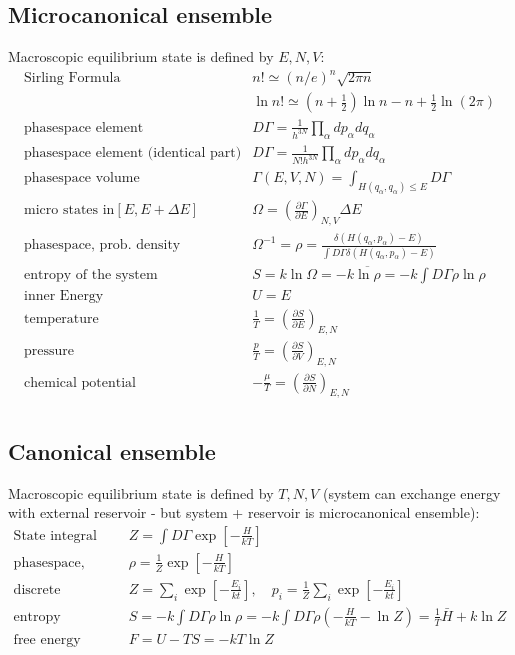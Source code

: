 \documentclass[../main.tex]{subfiles}
\begin{document}
\subsection{Microcanonical ensemble}
Macroscopic equilibrium state is defined by $E,N,V$:
\begin{eqnarray}
\text{Sirling Formula}  & n!\simeq(n/e)^n\sqrt{2\pi n}\\
                        & \ln n!\simeq(n+\frac{1}{2})\ln n-n+\frac{1}{2}\ln(2\pi)\\
\text{phasespace element} &D\Gamma=\frac{1}{h^{3N}}\prod_\alpha dp_\alpha dq_\alpha\\
\text{phasespace element (identical part)} &D\Gamma=\frac{1}{N!h^{3N}}\prod_\alpha dp_\alpha dq_\alpha\\
\text{phasespace volume}  &\Gamma(E,V,N)=\int_{H(q_\alpha,q_\alpha)\le E}D\Gamma\\
\text{micro states in} [E,E+\Delta E]  &\Omega=\left(\frac{\partial\Gamma}{\partial E}\right)_{N,V}\Delta E\\
\text{phasespace, prob. density} &\Omega^{-1}=\rho=\frac{\delta(H(q_\alpha,p_\alpha)-E)}{\int D\Gamma \delta(H(q_\alpha,p_\alpha)-E)}\\
\text{entropy of the system} & S=k\ln\Omega=-k\overline{\ln\rho}=-k\int D\Gamma \rho\ln\rho\\
\text{inner Energy} & U=E\\
\text{temperature} & \frac{1}{T}=\left(\frac{\partial S}{\partial E}\right)_{E,N}\\
\text{pressure} & \frac{p}{T}=\left(\frac{\partial S}{\partial V}\right)_{E,N}\\
\text{chemical potential} & -\frac{\mu}{T}=\left(\frac{\partial S}{\partial N}\right)_{E,N}\\
\end{eqnarray}

\subsection{Canonical ensemble}
Macroscopic equilibrium state is defined by $T,N,V$ (system can exchange energy with external reservoir - but system + reservoir is microcanonical ensemble):
\begin{eqnarray}
\text{State integral}            &Z=\int D\Gamma \exp[-\frac{H}{kT}]\\
\text{phasespace, prob. density} &\rho=\frac{1}{Z}\exp[-\frac{H}{kT}]\\
\text{discrete} & Z=\sum_i\exp[-\frac{E_i}{kt}],\quad p_i=\frac{1}{Z}\sum_i\exp[-\frac{E_i}{kt}]\\
\text{entropy} & S=-k\int D\Gamma \rho\ln\rho=-k\int D\Gamma \rho(-\frac{H}{kT}-\ln Z)=\frac{1}{T}\bar{H}+k\ln Z\\
\text{free energy} &F=U-TS=-kT\ln Z
\end{eqnarray}
\end{document}
